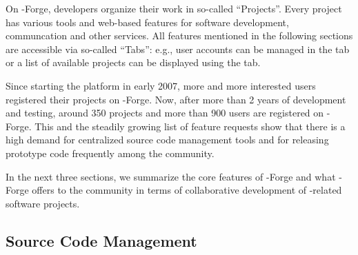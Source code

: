 




On \R{}-Forge, developers organize their work
in so-called ``Projects''. Every project has various tools and
web-based features for software development, communcation and other
services. All features mentioned in the 
following sections are accessible via so-called 
``Tabs'': e.g., user accounts can be managed in the  tab or
a list of available projects can be displayed using the
 tab.

Since starting the platform in early 2007, more
and more interested users registered their projects on
\R{}-Forge. Now, after more than 2 years of development and testing, around
350 projects and more than 900 
users are registered on \R{}-Forge. This and the steadily growing list of
feature requests show that there is a high demand for centralized source code
management tools and for releasing prototype code frequently among the
\R{} community. %

In the next three sections, we summarize the core features of
\R{}-Forge and what \R{}-Forge offers to the \R{} community in terms
of  collaborative development of \R{}-related software projects.

\subsection{Source Code Management}

